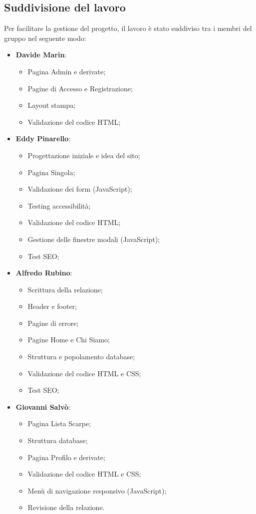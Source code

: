 \documentclass[a4paper, 12pt]{article}
\begin{document}
\begin{justify}
\subsection{Suddivisione del lavoro}

Per facilitare la gestione del progetto, il lavoro è stato suddiviso tra i membri del gruppo nel seguente modo:
\begin{itemize}
    \item \textbf{Davide Marin}: 
        \begin{itemize}
            \item Pagina Admin e derivate;
            \item Pagine di Accesso e Registrazione;
            \item Layout stampa;
            \item Validazione del codice HTML;
        \end{itemize}
    \item \textbf{Eddy Pinarello}:
        \begin{itemize}
            \item Progettazione iniziale e idea del sito;
            \item Pagina Singola;
            \item Validazione dei form (JavaScript);
            \item Testing accessibilità;
            \item Validazione del codice HTML;
            \item Gestione delle finestre modali (JavaScript);
            \item Test SEO;
        \end{itemize}
    \item \textbf{Alfredo Rubino}:
        \begin{itemize}
            \item Scrittura della relazione;
            \item Header e footer;
            \item Pagine di errore;
            \item Pagine Home e Chi Siamo;
            \item Struttura e popolamento database;
            \item Validazione del codice HTML e CSS;
            \item Test SEO;
        \end{itemize}
    \item \textbf{Giovanni Salvò}:
        \begin{itemize}
            \item Pagina Lista Scarpe;
            \item Struttura database;
            \item Pagina Profilo e derivate; 
            \item Validazione del codice HTML e CSS;
            \item Menù di navigazione responsivo (JavaScript);
            \item Revisione della relazione.
        \end{itemize}
\end{itemize}


\end{justify}
\end{document}
